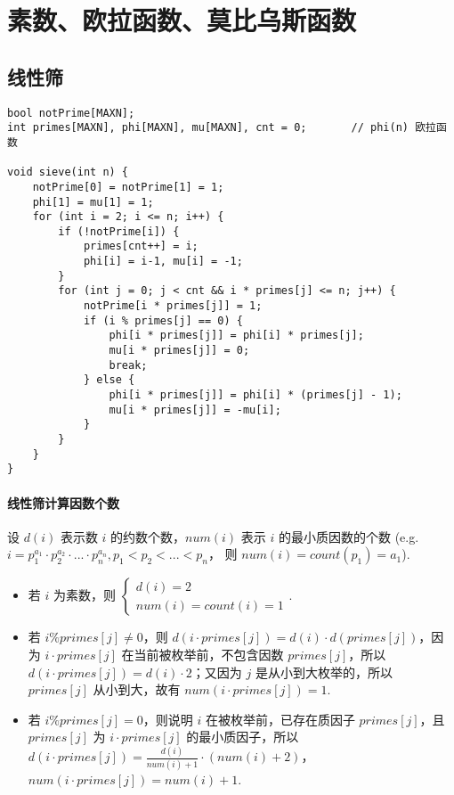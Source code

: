 \section{素数、欧拉函数、莫比乌斯函数}

\subsection{线性筛}
\begin{verbatim}
bool notPrime[MAXN];
int primes[MAXN], phi[MAXN], mu[MAXN], cnt = 0;       // phi(n) 欧拉函数

void sieve(int n) {
    notPrime[0] = notPrime[1] = 1;
    phi[1] = mu[1] = 1;
    for (int i = 2; i <= n; i++) {
        if (!notPrime[i]) {
            primes[cnt++] = i;
            phi[i] = i-1, mu[i] = -1;
        }
        for (int j = 0; j < cnt && i * primes[j] <= n; j++) {
            notPrime[i * primes[j]] = 1;
            if (i % primes[j] == 0) {
                phi[i * primes[j]] = phi[i] * primes[j];
                mu[i * primes[j]] = 0;
                break;
            } else {
                phi[i * primes[j]] = phi[i] * (primes[j] - 1);
                mu[i * primes[j]] = -mu[i];
            }
        }
    }
}
\end{verbatim}

\paragraph{线性筛计算因数个数} 设 $d(i)$ 表示数 $i$ 的约数个数，$num(i)$ 表示 $i$ 的最小质因数的个数 (e.g. $i = p_1^{a_1} \cdot p_2^{a_2} \cdot ... \cdot p_n^{a_n}, p_1 < p_2 < ... < p_n$， 则 $num(i) = count(p_1) = a_1$).
\begin{itemize}
\item 若 $i$ 为素数，则 $\begin{cases} d(i) = 2 \\ num(i) = count(i) = 1 \end{cases}$.
\item 若 $i \% primes[j] \neq 0$，则 $d(i \cdot primes[j]) = d(i) \cdot d(primes[j])$，因为 $i \cdot primes[j]$ 在当前被枚举前，不包含因数 $primes[j]$，所以 $d(i \cdot primes[j]) = d(i) \cdot 2$；又因为 $j$ 是从小到大枚举的，所以 $primes[j]$ 从小到大，故有 $num(i \cdot primes[j]) = 1$.
\item 若 $i \% primes[j] = 0$，则说明 $i$ 在被枚举前，已存在质因子 $primes[j]$，且 $primes[j]$ 为 $i \cdot primes[j]$ 的最小质因子，所以 $d(i \cdot primes[j]) = \frac{d(i)}{num(i) + 1} \cdot (num(i) + 2)$，$num(i \cdot primes[j]) = num(i) + 1$.
\end{itemize}

